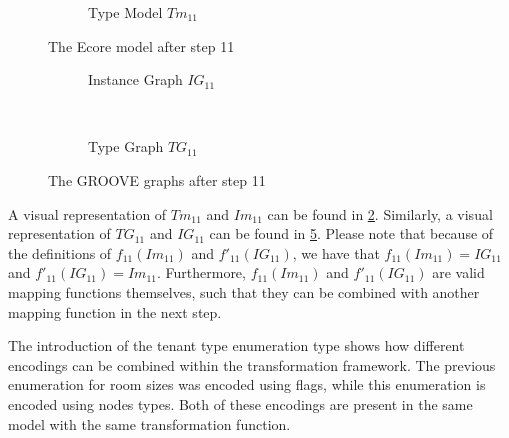 \begin{figure}[p]
\begin{subfigure}{0.98\textwidth}
        \caption{Type Model $Tm_{11}$}
        \label{fig:application:building_the_model:the_tenant_type_enumeration_type:ecore:type_model}
    \end{subfigure}
    \caption{The Ecore model after step 11}
    \label{fig:application:building_the_model:the_tenant_type_enumeration_type:ecore}
\end{figure}

\begin{figure}[p]
    \centering
    \begin{subfigure}{0.98\textwidth}
        \centering
        
        \caption{Instance Graph $IG_{11}$}
        \label{fig:application:building_the_model:the_tenant_type_enumeration_type:groove:instance_graph}
    \end{subfigure}
    \\
    \begin{subfigure}{0.98\textwidth}
        \centering
        
        \caption{Type Graph $TG_{11}$}
        \label{fig:application:building_the_model:the_tenant_type_enumeration_type:groove:type_graph}
    \end{subfigure}
    \caption{The GROOVE graphs after step 11}
    \label{fig:application:building_the_model:the_tenant_type_enumeration_type:groove}
\end{figure}

A visual representation of $Tm_{11}$ and $Im_{11}$ can be found in \cref{fig:application:building_the_model:the_tenant_type_enumeration_type:ecore}. Similarly, a visual representation of $TG_{11}$ and $IG_{11}$ can be found in \cref{fig:application:building_the_model:the_tenant_type_enumeration_type:groove}. Please note that because of the definitions of $f_{11}(Im_{11})$ and $f'_{11}(IG_{11})$, we have that $f_{11}(Im_{11}) = IG_{11}$ and $f'_{11}(IG_{11}) = Im_{11}$. Furthermore, $f_{11}(Im_{11})$ and $f'_{11}(IG_{11})$ are valid mapping functions themselves, such that they can be combined with another mapping function in the next step.

The introduction of the tenant type enumeration type shows how different encodings can be combined within the transformation framework. The previous enumeration for room sizes was encoded using flags, while this enumeration is encoded using nodes types. Both of these encodings are present in the same model with the same transformation function.

\afterpage{\FloatBarrier}